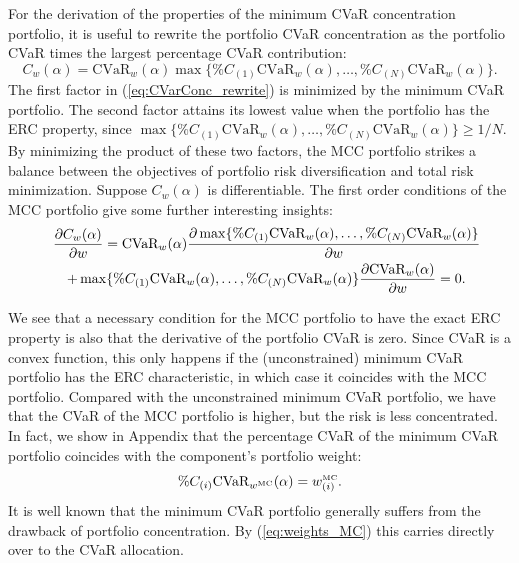 \documentclass[12pt,a4paper]{article}
\begin{document}
For the derivation of the properties of the minimum CVaR concentration portfolio, it is useful to rewrite the portfolio CVaR concentration as the portfolio CVaR times the largest percentage CVaR contribution:
\begin{equation} C_w(\alpha) = \mbox{CVaR}_w(\alpha) \max \{ \%C_{(1)}\mbox{CVaR}_w(\alpha) , \ldots ,  \%C_{(N)}\mbox{CVaR}_w(\alpha)\}. \label{eq:CVarConc_rewrite}\end{equation}
The first factor in (\ref{eq:CVarConc_rewrite}) is minimized by the minimum CVaR portfolio.  The second factor attains its lowest value when the portfolio has the ERC property, since $\max \{ \%C_{(1)}\mbox{CVaR}_w(\alpha) , \ldots ,  \%C_{(N)}\mbox{CVaR}_w(\alpha)\} \geq 1/N.$  By minimizing the product of these two factors, the MCC portfolio strikes a balance between the objectives of portfolio risk diversification and total risk minimization. Suppose $C_w(\alpha)$ is differentiable. The first order conditions of the MCC portfolio give some further interesting insights:
\begin{eqnarray}
\lefteqn{ \frac{\partial C_w(\alpha)}{\partial w} = \mbox{CVaR}_w(\alpha) \frac{\partial \max\{ \%C_{(1)}\mbox{CVaR}_w(\alpha) , \ldots ,  \%C_{(N)}\mbox{CVaR}_w(\alpha) \}}{\partial w} } && \notag \\
&& +  \max\{ \%C_{(1)}\mbox{CVaR}_w(\alpha) , \ldots ,  \%C_{(N)}\mbox{CVaR}_w(\alpha) \} \frac{\partial \mbox{CVaR}_w(\alpha)}{\partial w} = 0.
\label{eq:FOC_MCC}\end{eqnarray}

We see that a necessary condition for the MCC portfolio to have the exact ERC property is also that the derivative of the portfolio CVaR is zero. Since CVaR is a convex function, this only happens if the (unconstrained) minimum CVaR portfolio has the ERC characteristic, in which case it coincides with the MCC portfolio. Compared with the unconstrained minimum CVaR portfolio, we have that the CVaR of the MCC portfolio is higher, but the risk is less concentrated. In fact, we show in Appendix that the percentage CVaR of the minimum CVaR portfolio coincides with the component's portfolio weight:
\begin{equation} \%C_{(i)} \mbox{CVaR}_{w^{\mbox{\tiny MC}}}(\alpha) = w^{\mbox{\tiny MC}}_{(i)}. \label{eq:weights_MC}\end{equation}
It is well known that the minimum CVaR portfolio generally suffers from the drawback of portfolio concentration. By (\ref{eq:weights_MC}) this carries directly over to the CVaR allocation.
\end{document}
